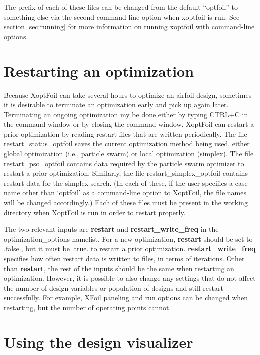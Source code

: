 \documentclass[11pt]{article}
\begin{document}
The prefix of each of these files can be changed from the default ``optfoil'' to something
else via the second command-line option when xoptfoil is run. See section
\ref{sec:running} for more information on running xoptfoil with command-line options.

\section{Restarting an optimization}\label{sec:restarting}

Because XoptFoil can take several hours to optimize an airfoil design, sometimes it is
desirable to terminate an optimization early and pick up again later.  Terminating an
ongoing optimization my be done either by typing CTRL+C in the command window or by
closing the command window.  XoptFoil can restart a prior optimization
by reading restart files that are written periodically. The file restart\_status\_optfoil
saves the current optimization method being used, either global optimization (i.e.,
particle swarm) or local optimization (simplex).  The file restart\_pso\_optfoil contains
data required by the particle swarm optimizer to restart a prior optimization. Similarly,
the file restart\_simplex\_optfoil contains restart data for the simplex search. (In each
of these, if the user specifies a case name other than `optfoil' as a command-line option
to XoptFoil, the file names will be changed accordingly.)  Each of these files must be
present in the working directory when XoptFoil is run in order to restart properly.

The two relevant inputs are \textbf{restart} and \textbf{restart\_write\_freq} in the
optimization\_options namelist.  For a new optimization, \textbf{restart} should be set to
.false., but it must be .true. to restart a prior optimization.
\textbf{restart\_write\_freq} specifies how often restart data is written to files, in
terms of iterations.  Other than \textbf{restart}, the rest of the inputs should be the
same when restarting an optimization.  However, it is possible to also change any settings
that do not affect the number of design variables or population of designs and still
restart successfully.  For example, XFoil paneling and run options can be changed when
restarting, but the number of operating points cannot. 

\section{Using the design visualizer}\label{sec:design_visualizer}
\end{document}
